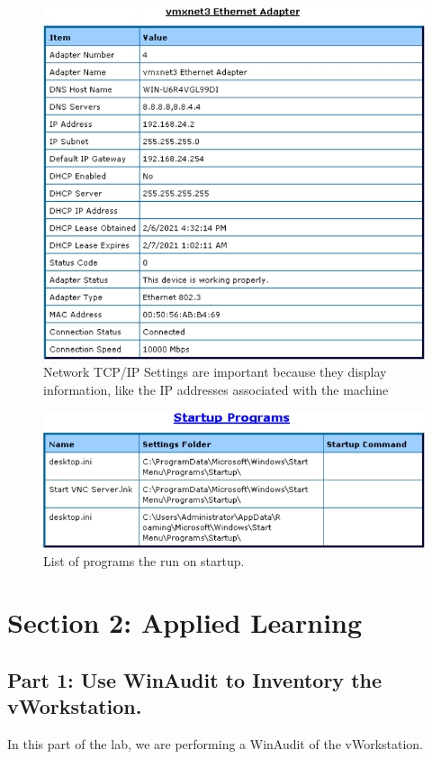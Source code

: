 \begin{figure}[H]
    \centering
    \includegraphics[width=0.8\linewidth]{figures/pic7.png}
    \caption{Network TCP/IP Settings are important because they display information, like the IP addresses associated with the machine}
\end{figure}

\begin{figure}[H]
    \centering
    \includegraphics[width=0.8\linewidth]{figures/pic8.png}
    \caption{List of programs the run on startup.}
\end{figure}

\section{Section 2: Applied Learning}
\subsection{Part 1: Use WinAudit to Inventory the vWorkstation.}
In this part of the lab, we are performing a WinAudit of the vWorkstation.

